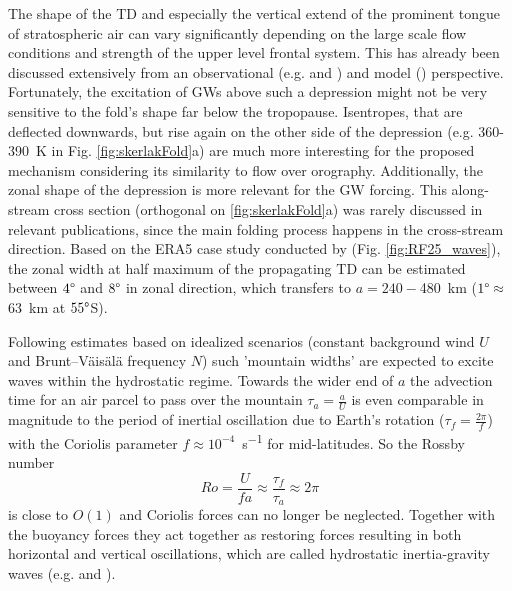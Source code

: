 The shape of the TD and especially the vertical extend of the prominent tongue of stratospheric air can vary significantly depending on the large scale flow conditions and strength of the upper level frontal system. This has already been discussed extensively from an observational (e.g. \cite{shapiro_further_1978} and \cite{keyser_review_1986}) and model (\cite{skerlak_tropopause_2015}) perspective. Fortunately, the excitation of GWs above such a depression might not be very sensitive to the fold's shape far below the tropopause. Isentropes, that are deflected downwards, but rise again on the other side of the depression (e.g. 360-\SI{390}{\kelvin} in Fig. \ref{fig:skerlakFold}a) are much more interesting for the proposed mechanism considering its similarity to flow over orography. Additionally, the zonal shape of the depression is more relevant for the GW forcing. This along-stream cross section (orthogonal on \ref{fig:skerlakFold}a) was rarely discussed in relevant publications, since the main folding process happens in the cross-stream direction. Based on the ERA5 case study conducted by \textcite{dornbrack_stratospheric_2022} (Fig. \ref{fig:RF25_waves}), the zonal width at half maximum of the propagating TD can be estimated between $4 \degree$ and $8 \degree$ in zonal direction, which transfers to $a=240-$\SI{480}{\kilo\meter}
($1\degree \approx$ \SI{63}{\kilo\meter} at $55 \degree$S). 



Following estimates based on idealized scenarios (constant background wind $U$ and Brunt–Väisälä frequency $N$) such 'mountain widths' are expected to excite waves within the hydrostatic regime. Towards the wider end of $a$ the advection time for an air parcel to pass over the mountain $\tau_a = \frac{a}{U}$ is even comparable in magnitude to the period of inertial oscillation due to Earth’s rotation ($\tau_f = \frac{2 \pi}{f}$) with the Coriolis parameter $f \approx 10^{-4}$\SI{}{\second^{-1}} for mid-latitudes. So the Rossby number
\begin{equation}
    Ro = \frac{U}{f a} \approx \frac{\tau_f}{\tau_a} \approx 2 \pi
\end{equation}
%
is close to $O(1)$ and Coriolis forces can no longer be neglected. Together with the buoyancy forces they act together as restoring forces resulting in both horizontal and vertical oscillations, which are called hydrostatic inertia-gravity waves (e.g. \cite{gill_atmosphere-ocean_1982} and \cite{lin_mesoscale_2007}).

